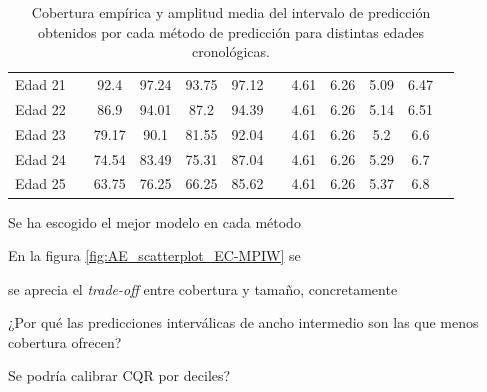 \begin{table}[]
\begin{tabular}{cccccccccccc}
    Edad 21                          &  & 92.4          & 97.24        & 93.75       & 97.12        &  & 4.61                     & 6.26                    & 5.09                  & 6.47                   \\
    Edad 22                          &  & 86.9          & 94.01        & 87.2        & 94.39        &  & 4.61                     & 6.26                    & 5.14                  & 6.51                   \\
    Edad 23                          &  & 79.17         & 90.1         & 81.55       & 92.04        &  & 4.61                     & 6.26                    & 5.2                   & 6.6                    \\
    Edad 24                          &  & 74.54         & 83.49        & 75.31       & 87.04        &  & 4.61                     & 6.26                    & 5.29                  & 6.7                    \\
    Edad 25                          &  & 63.75         & 76.25        & 66.25       & 85.62        &  & 4.61                     & 6.26                    & 5.37                  & 6.8                    \\ 
    \bottomrule
    \end{tabular}
    \caption[
        Cobertura empírica y amplitud media del intervalo de predicción obtenidos por cada método de 
        predicción para distintas edades cronológicas.
    ]{
        Cobertura empírica y amplitud media del intervalo de predicción obtenidos por cada método de 
        predicción para distintas edades cronológicas.
    }
    \label{}
\end{table}










Se ha escogido el mejor modelo en cada método

En la figura \ref{fig:AE_scatterplot_EC-MPIW} se 


se aprecia el \textit{trade-off} entre cobertura y tamaño, concretamente 




¿Por qué las predicciones interválicas de ancho intermedio son las que menos cobertura ofrecen?

Se podría calibrar CQR por deciles?


